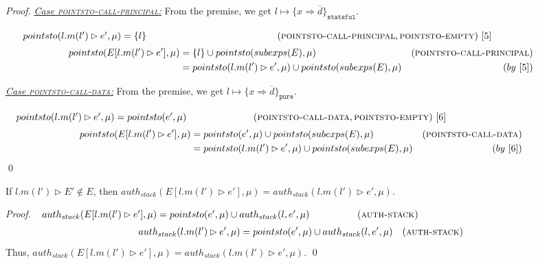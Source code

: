 \documentclass{llncs}
\newcommand{\keywadj}[1]{\mathtt{#1}}
\begin{document}
\begin{proof}
\noindent\underline{\textit{Case \textsc{pointsto-call-principal}:}} From the premise, we get $l \mapsto \{ x \Rightarrow \overline{d} \}_{\keywadj{stateful}}$.

\noindent$~~~~~pointsto(l.m(l') \rhd e', \mu) = \{ l \}~~~~~~~~~~~~~~~~~~~~~~~~~~~~~~~~~~~~~~~~~(\textsc{pointsto-call-principal}, \textsc{pointsto-empty})~[5]$
\vspace{-7pt}
\begin{align*}
pointsto(E[l.m(l') \rhd e'], \mu) &= \{ l \} \cup pointsto(subexps(E), \mu) & (\textsc{pointsto-call-principal})\\
&= pointsto(l.m(l') \rhd e', \mu) \cup pointsto(subexps(E), \mu) & (by~[5])
\end{align*}

\noindent\underline{\textit{Case \textsc{pointsto-call-data}:}} From the premise, we get $l \mapsto \{ x \Rightarrow \overline{d} \}_{\keywadj{pure}}$.

$~~~pointsto(l.m(l') \rhd e', \mu) = pointsto(e', \mu)~~~~~~~~~~~~~~~~~~~~~(\textsc{pointsto-call-data}, \textsc{pointsto-empty})~[6]$
\vspace{-7pt}
\begin{align*}
pointsto(E[l.m(l') \rhd e'], \mu) &= pointsto(e', \mu) \cup pointsto(subexps(E), \mu) & (\textsc{pointsto-call-data})\\
&= pointsto(l.m(l') \rhd e', \mu) \cup pointsto(subexps(E), \mu) & (by~[6])
\end{align*}
\qed
\end{proof}


\begin{mdframed}
\begin{lemma}
\label{l:simplify-a-stack}
If $l.m(l') \rhd E' \not\in E$, then $auth_{stack}(E[l.m(l') \rhd e'], \mu) = auth_{stack}(l.m(l') \rhd e', \mu)$.
\end{lemma}
\end{mdframed}

\begin{proof} $~~auth_{stack}(E[l.m(l') \rhd e'], \mu) = pointsto(e', \mu) \cup auth_{stack}(l, e', \mu)~~~~~~~~~~~~~~~(\textsc{auth-stack})$
\vspace{-7pt}
\begin{align*}
auth_{stack}(l.m(l') \rhd e', \mu) &= pointsto(e', \mu) \cup auth_{stack}(l, e', \mu)& (\textsc{auth-stack})
\end{align*}
Thus, $auth_{stack}(E[l.m(l') \rhd e'], \mu) = auth_{stack}(l.m(l') \rhd e', \mu)$.
\qed
\end{proof}
\end{document}
